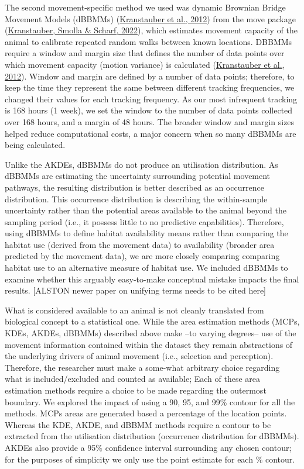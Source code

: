 \documentclass[10pt,a4paper]{article}
\begin{document}
The second movement-specific method we used was dynamic Brownian Bridge Movement Models (dBBMMs) (\protect\hyperlink{ref-Kranstauber2012}{Kranstauber et al., 2012}) from the move package (\protect\hyperlink{ref-move}{Kranstauber, Smolla \& Scharf, 2022}), which estimates movement capacity of the animal to calibrate repeated random walks between known locations.
DBBMMs require a window and margin size that defines the number of data points over which movement capacity (motion variance) is calculated (\protect\hyperlink{ref-Kranstauber2012}{Kranstauber et al., 2012}).
Window and margin are defined by a number of data points; therefore, to keep the time they represent the same between different tracking frequencies, we changed their values for each tracking frequency.
As our most infrequent tracking is 168 hours (1 week), we set the window to the number of data points collected over 168 hours, and a margin of 48 hours.
The broader window and margin sizes helped reduce computational costs, a major concern when so many dBBMMs are being calculated.

Unlike the AKDEs, dBBMMs do not produce an utilisation distribution.
As dBBMMs are estimating the uncertainty surrounding potential movement pathways, the resulting distribution is better described as an occurrence distribution.
This occurrence distribution is describing the within-sample uncertainty rather than the potential areas available to the animal beyond the sampling period (i.e., it possess little to no predictive capabilities).
Therefore, using dBBMMs to define habitat availability means rather than comparing the habitat use (derived from the movement data) to availability (broader area predicted by the movement data), we are more closely comparing comparing habitat use to an alternative measure of habitat use.
We included dBBMMs to examine whether this arguably easy-to-make conceptual mistake impacts the final results.
{[}ALSTON newer paper on unifying terms needs to be cited here{]}

What is considered available to an animal is not cleanly translated from biological concept to a statistical one.
While the area estimation methods (MCPs, KDEs, AKDEs, dBBMMs) described above make --to varying degrees-- use of the movement information contained within the dataset they remain abstractions of the underlying drivers of animal movement (i.e., selection and perception).
Therefore, the researcher must make a some-what arbitrary choice regarding what is included/excluded and counted as available; Each of these area estimation methods require a choice to be made regarding the outermost boundary.
We explored the impact of using a 90, 95, and 99\% contour for all the methods.
MCPs areas are generated based a percentage of the location points.
Whereas the KDE, AKDE, and dBBMM methods require a contour to be extracted from the utilisation distribution (occurrence distribution for dBBMMs).
AKDEs also provide a 95\% confidence interval surrounding any chosen contour; for the purposes of simplicity we only use the point estimate for each \% contour.
\end{document}
